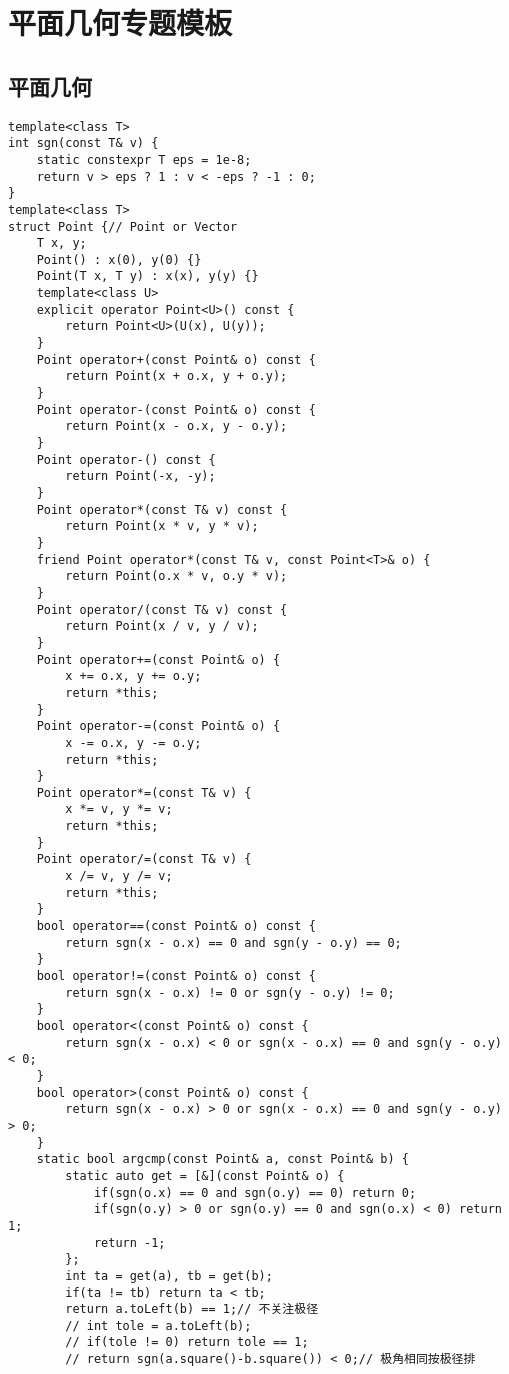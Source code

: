 \section{平面几何专题模板}
\subsection{平面几何}
\begin{lstlisting}
template<class T>
int sgn(const T& v) {
    static constexpr T eps = 1e-8;
    return v > eps ? 1 : v < -eps ? -1 : 0;
}
template<class T>
struct Point {// Point or Vector
    T x, y;
    Point() : x(0), y(0) {}
    Point(T x, T y) : x(x), y(y) {}
    template<class U>
    explicit operator Point<U>() const {
        return Point<U>(U(x), U(y));
    }
    Point operator+(const Point& o) const {
        return Point(x + o.x, y + o.y);
    }
    Point operator-(const Point& o) const {
        return Point(x - o.x, y - o.y);
    }
    Point operator-() const {
        return Point(-x, -y);
    }
    Point operator*(const T& v) const {
        return Point(x * v, y * v);
    }
    friend Point operator*(const T& v, const Point<T>& o) {
        return Point(o.x * v, o.y * v);
    }
    Point operator/(const T& v) const {
        return Point(x / v, y / v);
    }
    Point operator+=(const Point& o) {
        x += o.x, y += o.y;
        return *this;
    }
    Point operator-=(const Point& o) {
        x -= o.x, y -= o.y;
        return *this;
    }
    Point operator*=(const T& v) {
        x *= v, y *= v;
        return *this;
    }
    Point operator/=(const T& v) {
        x /= v, y /= v;
        return *this;
    }
    bool operator==(const Point& o) const {
        return sgn(x - o.x) == 0 and sgn(y - o.y) == 0;
    }
    bool operator!=(const Point& o) const {
        return sgn(x - o.x) != 0 or sgn(y - o.y) != 0;
    }
    bool operator<(const Point& o) const {
        return sgn(x - o.x) < 0 or sgn(x - o.x) == 0 and sgn(y - o.y) < 0;
    }
    bool operator>(const Point& o) const {
        return sgn(x - o.x) > 0 or sgn(x - o.x) == 0 and sgn(y - o.y) > 0;
    }
    static bool argcmp(const Point& a, const Point& b) {
        static auto get = [&](const Point& o) {
            if(sgn(o.x) == 0 and sgn(o.y) == 0) return 0;
            if(sgn(o.y) > 0 or sgn(o.y) == 0 and sgn(o.x) < 0) return 1;
            return -1;
        };
        int ta = get(a), tb = get(b);
        if(ta != tb) return ta < tb;
        return a.toLeft(b) == 1;// 不关注极径
        // int tole = a.toLeft(b);
        // if(tole != 0) return tole == 1;
        // return sgn(a.square()-b.square()) < 0;// 极角相同按极径排

\end{lstlisting}
